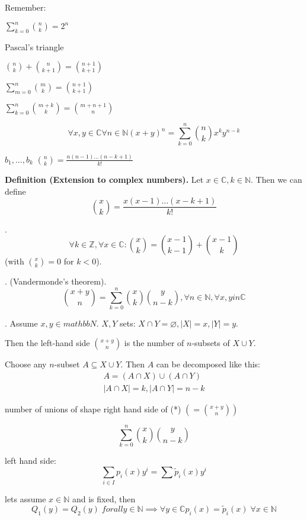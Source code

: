 Remember:
\begin{compactitem}
  \item $\sum_{k=0}^n {n\choose k} = 2^n$
  \item Pascal's triangle
  \item ${n\choose k} + {n\choose k+1} = {n+1 \choose k+1}$
  \item $\sum_{m=0}^n {m\choose k} = {n+1 \choose k+1}$
  \item $\sum_{k=0}^n {m+k \choose k} = {m+n+1 \choose n}$
\end{compactitem}

\[
  \forall x,y\in \mathbb{C}
  \forall n\in \mathbb{N}
  (x+y)^n = \sum_{k=0}^n {n\choose k} x^k y^{n-k}
\]

$b_1, \ldots, b_k$ \; ${n \choose k} = \frac{n(n-1) \ldots (n-k+1)}{k!}$

\textbf{Definition (Extension to complex numbers).}
Let $x\in \mathbb{C}, k\in\mathbb{N}$. Then we can define
\[
  {x\choose k} = \frac{
    x (x-1) \ldots (x-k+1)
  }{
    k!
  }
\]

\Lemma.
\[
  \forall k \in \mathbb{Z}, \forall x\in \mathbb{C}:
  {x\choose k} = {x-1 \choose k-1} + {x-1 \choose k}
\]
(with ${x \choose k} = 0$ for $k < 0$).

\Theorem. (Vandermonde's theorem).
\[
  {x+y \choose n} = \sum_{k=0}^{n} {x\choose k} {y\choose n-k},
  \forall n \in \mathbb{N}, \forall x,y in \mathbb{C}
\]

\Proof.
Assume $x,y\in mathbb{N}$. $X,Y$ sets: $X\cap Y=\varnothing, |X|=x, |Y|=y$.

Then the left-hand side
${x+y \choose n}$
is the number of $n$-subsets of $X\cup Y$.

Choose any $n$-subset $A\subseteq X\cup Y$.
Then $A$ can be decomposed like this:
\begin{gather*}
  A = (A\cap X)\cup (A\cap Y) \\
  |A\cap X| = k, |A\cap Y| = n-k
\end{gather*}

number of unions of shape right hand side of (*) $(={x+y \choose n} )$

\[
  \sum_{k=0}^n {x\choose k} {y\choose n-k}
\]

left hand side: 
\[
  \sum_{i\in I} p_i (x) y^i
  = \sum \widetilde p_i (x) y^i
\]

lets assume $x\in \mathbb{N}$ and is fixed, then
\[
  Q_1(y) = Q_2(y) \; forall y \in \mathbb{N} 
  \implies \forall y\in \mathbb{C}
  p_i(x) = \widetilde p_i(x) \; \forall x \in \mathbb{N}
\]

